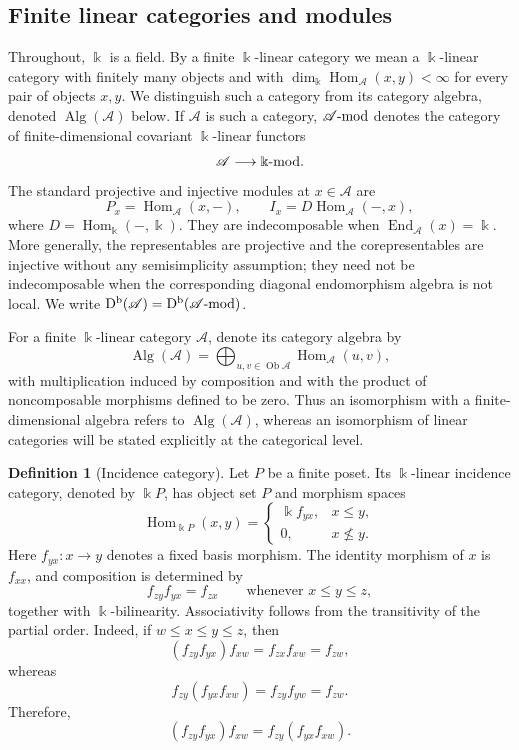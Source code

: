 \documentclass[12pt,a4paper,english,reqno]{amsart}
\theoremstyle{plain}
\theoremstyle{definition}
\newtheorem{definition}[theorem]{Definition}
\newcommand{\kk}{\Bbbk}
\newcommand{\Db}{\mathrm D^{\mathrm b}}
\newcommand{\Hom}{\operatorname{Hom}}
\newcommand{\End}{\operatorname{End}}
\newcommand{\modcat}{\ensuremath{\mbox{\rm -mod}}}
\begin{document}
\subsection{Finite linear categories and modules}

Throughout, $\kk$ is a field. By a finite $\kk$-linear category we
mean a $\kk$-linear category with finitely many objects and with
$\dim_{\kk}\Hom_{\mathcal A}(x,y)<\infty$ for every pair of objects
$x,y$. We distinguish such a category from its category algebra, denoted
$\operatorname{Alg}(\mathcal A)$ below. If $\mathcal A$ is such a category,
$\mathcal A\modcat$ denotes the category of finite-dimensional
covariant $\kk$-linear functors
\[
 \mathcal A\longrightarrow \kk\modcat.
\]
The standard projective and injective modules at $x\in\mathcal A$ are
\[
 P_x=\Hom_{\mathcal A}(x,-),\qquad
 I_x=D\Hom_{\mathcal A}(-,x),
\]
where $D=\Hom_{\kk}(-,\kk)$.  They are indecomposable when
$\End_{\mathcal A}(x)=\kk$.  More generally, the representables are
projective and the corepresentables are injective without any semisimplicity
assumption; they need not be indecomposable when the corresponding diagonal
endomorphism algebra is not local.  We write
$\Db(\mathcal A)=\Db(\mathcal A\modcat)$.

For a finite $\kk$-linear category $\mathcal A$, denote its category
algebra by
\begin{equation}
 \operatorname{Alg}(\mathcal A)
 =
 \bigoplus_{u,v\in\operatorname{Ob}\mathcal A}
 \Hom_{\mathcal A}(u,v),
\label{eq:category-algebra}
\end{equation}
with multiplication induced by composition and with the product of
noncomposable morphisms defined to be zero. Thus an isomorphism with a
finite-dimensional algebra refers to $\operatorname{Alg}(\mathcal A)$,
whereas an isomorphism of linear categories will be stated explicitly at the
categorical level.


\begin{definition}[Incidence category]
Let $P$ be a finite poset. Its $\kk$-linear incidence category,
denoted by $\kk P$, has object set $P$ and morphism spaces
\[
\Hom_{\kk P}(x,y)=
\begin{cases}
\kk f_{yx},&x\leq y,\\
0,&x\nleq y.
\end{cases}
\]
Here $f_{yx}:x\to y$ denotes a fixed basis morphism. The identity
morphism of $x$ is $f_{xx}$, and composition is determined by
\[
f_{zy}f_{yx}=f_{zx}
\qquad\text{whenever }x\leq y\leq z,
\]
together with $\kk$-bilinearity.
Associativity follows from the transitivity of the partial order. Indeed,
if $w\leq x\leq y\leq z$, then
\[
(f_{zy}f_{yx})f_{xw}
=
f_{zx}f_{xw}
=
f_{zw},
\]
whereas
\[
f_{zy}(f_{yx}f_{xw})
=
f_{zy}f_{yw}
=
f_{zw}.
\]
Therefore,
\[
(f_{zy}f_{yx})f_{xw}
=
f_{zy}(f_{yx}f_{xw}).
\]
\end{definition}
\end{document}
